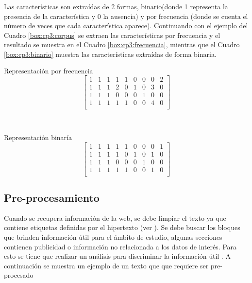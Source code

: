 Las características son extraídas de 2 formas, binario(donde 1 representa la presencia de la característica y 0 la ausencia) y por frecuencia (donde se cuenta el número de veces que cada característica aparece). Continuando con el ejemplo del Cuadro \ref{box:cp3:corpus} se extraen las características por frecuencia y el resultado se muestra en el Cuadro \ref{box:cp3:frecuencia}, mientras que el Cuadro \ref{box:cp3:binario} muestra las características extraídas de forma binaria.\\


\begin{mygraybox}[label={box:cp3:frecuencia}]{Representación por frecuencia} 
\begin{equation*}
\begin{bmatrix}
1 & 1 & 1 & 1 & 1 & 0 & 0 & 0 & 2\\
1 & 1 & 1 & 2 & 0 & 1 & 0 & 3 & 0\\
1 & 1 & 1 & 0 & 0 & 0 & 1 & 0 & 0\\
1 & 1 & 1 & 1 & 1 & 0 & 0 & 4 & 0\\
\end{bmatrix}
\end{equation*}
\end{mygraybox}

\ \\

\begin{mygraybox}[label={box:cp3:binario}]{Representación binaría} 
\begin{equation*}
\begin{bmatrix}
1 & 1 & 1 & 1 & 1 & 0 & 0 & 0 & 1\\
1 & 1 & 1 & 1 & 0 & 1 & 0 & 1 & 0\\
1 & 1 & 1 & 0 & 0 & 0 & 1 & 0 & 0\\
1 & 1 & 1 & 1 & 1 & 0 & 0 & 1 & 0\\
\end{bmatrix}
\end{equation*}
\end{mygraybox}


\subsection[Pre-procesamiento]{Pre-procesamiento}


Cuando se recupera  información de la web, se debe limpiar el texto ya que contiene etiquetas definidas por el hipertexto (ver ). Se debe buscar los bloques que brinden información útil para el ámbito de estudio, algunas secciones contienen publicidad o información no relacionada a los datos de interés. Para esto se tiene que realizar un análisis para discriminar la información útil \citep{CD1}. A continuación se muestra un ejemplo de un texto que que requiere ser pre-procesado\\

